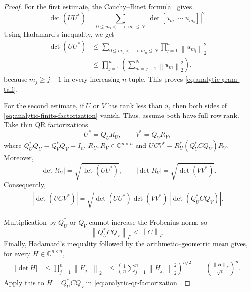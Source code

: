 \documentclass[11pt]{article}
\theoremstyle{definition}
\theoremstyle{remark}
\newcommand{\C}{\mathbb{C}}
\newcommand{\norm}[1]{\left\lVert #1\right\rVert}
\newcommand{\abs}[1]{\left\lvert #1\right\rvert}
\begin{document}
\begin{proof}
For the first estimate, the Cauchy--Binet formula~\cite[Section~0.8.7]{HornJohnson2013} gives
\[
    \det(UU^*)
    =
    \sum_{0\le m_1<\cdots<m_n\le N}
    \abs{\det[u_{m_1}\ \cdots\ u_{m_n}]}^2.
\]
Using Hadamard's inequality, we get
\[
\begin{aligned}
    \det(UU^*)
    &\le
    \sum_{0\le m_1<\cdots<m_n\le N}
    \prod_{j=1}^n\norm{u_{m_j}}_2^2\\
    &\le
    \prod_{j=1}^n
    \left(
      \sum_{m=j-1}^N\norm{u_m}_2^2
    \right),
\end{aligned}
\]
because \(m_j\ge j-1\) in every increasing \(n\)-tuple.  This proves
\eqref{eq:analytic-gram-tail}.

For the second estimate, if \(U\) or \(V\) has rank less than \(n\),
then both sides of \eqref{eq:analytic-finite-factorization} vanish.
Thus, assume both have full row rank.
Take thin QR factorizations
\[
    U^*=Q_UR_U,
    \qquad
    V^*=Q_VR_V,
\]
where
$
    Q_U^*Q_U=Q_V^*Q_V=I_n
$, \(R_U,R_V\in\C^{n\times n}\) and
$
    UCV^*
    =
    R_U^*(Q_U^*CQ_V)R_V.
$
Moreover,
\[
    \abs{\det R_U}
    =
    \sqrt{\det(UU^*)},
    \qquad
    \abs{\det R_V}
    =
    \sqrt{\det(VV^*)}.
\]
Consequently,
\begin{equation}
\begin{aligned}
    \abs{\det(UCV^*)}
    =
    \sqrt{\det(UU^*)\det(VV^*)}\,
    \abs{\det(Q_U^*CQ_V)}.
    \label{eq:analytic-qr-factorization}
\end{aligned}
\end{equation}

Multiplication by \(Q_U^*\) or \(Q_V\) cannot increase the Frobenius
norm, so
\[
    \norm{Q_U^*CQ_V}_F\le\norm{C}_F.
\]
Finally, Hadamard's inequality followed by the arithmetic--geometric mean
gives, for every \(H\in\C^{n\times n}\),
\[
\begin{aligned}
    \abs{\det H}
    &\le
    \prod_{j=1}^n\norm{H_{j,:}}_2
    &\le
    \left(
      \frac1n\sum_{j=1}^n\norm{H_{j,:}}_2^2
    \right)^{n/2} 
    &=
    \left(\frac{\norm{H}_F}{\sqrt n}\right)^n.
\end{aligned}
\]
Apply this to \(H=Q_U^*CQ_V\) in
\eqref{eq:analytic-qr-factorization}.
\end{proof}
\end{document}
